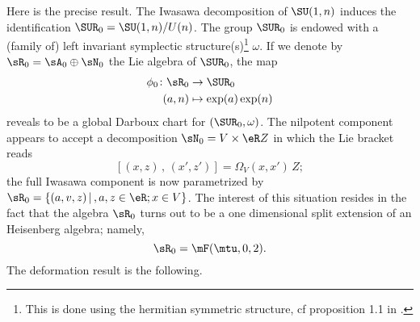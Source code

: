 Here is the precise result. The Iwasawa decomposition of $\SU(1,n)$ induces the identification $\SUR_0=\SU(1,n)/U(n)$. The group $\SUR_0$ is endowed with a (family of) left invariant symplectic structure(s)\footnote{This is done using the hermitian symmetric structure, cf proposition 1.1 in \cite{Biel-Massar}.} $\omega$.  If we denote by $\sR_0=\sA_0\oplus\sN_0$ the Lie algebra of $\SUR_0$, the map
\begin{equation}  \label{DARBOUX}
\begin{aligned}
 \phi_0\colon \sR_0&\to \SUR_0 \\
(a,n)&\mapsto \exp(a)\exp(n)
\end{aligned}
\end{equation}
reveals to be a global Darboux chart for $(\SUR_0,\omega)$.  The nilpotent component appears to accept a decomposition $\sN_0=V\times\eR Z$ in which the Lie bracket reads
\[
[(x,z)\,,\,(x',z')]=\Omega_V(x,x')\,Z;
\]
the full Iwasawa component is now parametrized by $\sR_0=\{(a,v,z)\,|\,,a,z\in\eR;x\in V\}$. The interest of this situation resides in the fact that the algebra $\sR_0$ turns out to be a one dimensional split extension of an Heisenberg algebra; namely,
\[
\sR_0=\mF(\mtu,0,2).
\]
The deformation result is the following.

